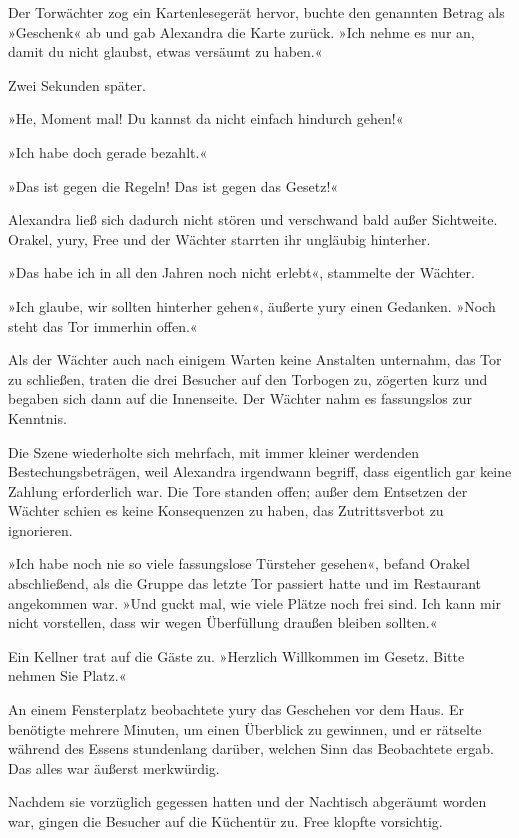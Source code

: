 Der Torwächter zog ein Kartenlesegerät hervor, buchte den genannten Betrag als »Geschenk« ab und gab Alexandra die Karte zurück. »Ich nehme es nur an, damit du nicht glaubst, etwas versäumt zu haben.«

Zwei Sekunden später.

»He, Moment mal! Du kannst da nicht einfach hindurch gehen!«

»Ich habe doch gerade bezahlt.«

»Das ist gegen die Regeln! Das ist gegen das Gesetz!«

Alexandra ließ sich dadurch nicht stören und verschwand bald außer Sichtweite. Orakel, yury, Free und der Wächter starrten ihr ungläubig hinterher.

»Das habe ich in all den Jahren noch nicht erlebt«, stammelte der Wächter.

»Ich glaube, wir sollten hinterher gehen«, äußerte yury einen Gedanken. »Noch steht das Tor immerhin offen.«

Als der Wächter auch nach einigem Warten keine Anstalten unternahm, das Tor zu schließen, traten die drei Besucher auf den Torbogen zu, zögerten kurz und begaben sich dann auf die Innenseite. Der Wächter nahm es fassungslos zur Kenntnis.

Die Szene wiederholte sich mehrfach, mit immer kleiner werdenden Bestechungsbeträgen, weil Alexandra irgendwann begriff, dass eigentlich gar keine Zahlung erforderlich war. Die Tore standen offen; außer dem Entsetzen der Wächter schien es keine Konsequenzen zu haben, das Zutrittsverbot zu ignorieren.

»Ich habe noch nie so viele fassungslose Türsteher gesehen«, befand Orakel abschließend, als die Gruppe das letzte Tor passiert hatte und im Restaurant angekommen war. »Und guckt mal, wie viele Plätze noch frei sind. Ich kann mir nicht vorstellen, dass wir wegen Überfüllung draußen bleiben sollten.«

Ein Kellner trat auf die Gäste zu. »Herzlich Willkommen im Gesetz. Bitte nehmen Sie Platz.«

An einem Fensterplatz beobachtete yury das Geschehen vor dem Haus. Er benötigte mehrere Minuten, um einen Überblick zu gewinnen, und er rätselte während des Essens stundenlang darüber, welchen Sinn das Beobachtete ergab. Das alles war äußerst merkwürdig.

Nachdem sie vorzüglich gegessen hatten und der Nachtisch abgeräumt worden war, gingen die Besucher auf die Küchentür zu. Free klopfte vorsichtig.

